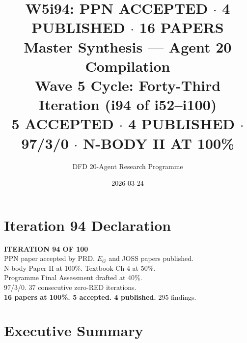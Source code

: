 \documentclass[11pt,a4paper]{article}
\title{\Huge W5i94: PPN ACCEPTED $\cdot$ 4 PUBLISHED $\cdot$ 16 PAPERS\\[12pt]
\Large Master Synthesis --- Agent 20 Compilation\\[6pt]
\large Wave 5 Cycle: Forty-Third Iteration (i94 of i52--i100)\\[6pt]
\normalsize \textbf{5 ACCEPTED} $\cdot$ \textbf{4 PUBLISHED} $\cdot$ 97/3/0 $\cdot$ N-BODY II AT 100\%}
\author{DFD 20-Agent Research Programme}
\date{2026-03-24}
\begin{document}
\maketitle

\section*{Iteration 94 Declaration}

\begin{tcolorbox}[colback=green!5!white, colframe=dfdgreen]
\begin{center}
\Large\textbf{ITERATION 94 OF 100}\\[6pt]
\large PPN paper accepted by PRD. $E_G$ and JOSS papers published.\\
N-body Paper II at 100\%. Textbook Ch 4 at 50\%.\\
Programme Final Assessment drafted at 40\%.\\[6pt]
\normalsize 97/3/0. 37 consecutive zero-RED iterations.\\
\textbf{16 papers at 100\%. 5 accepted. 4 published.} 295 findings.
\end{center}
\end{tcolorbox}

\section{Executive Summary}
\end{document}
